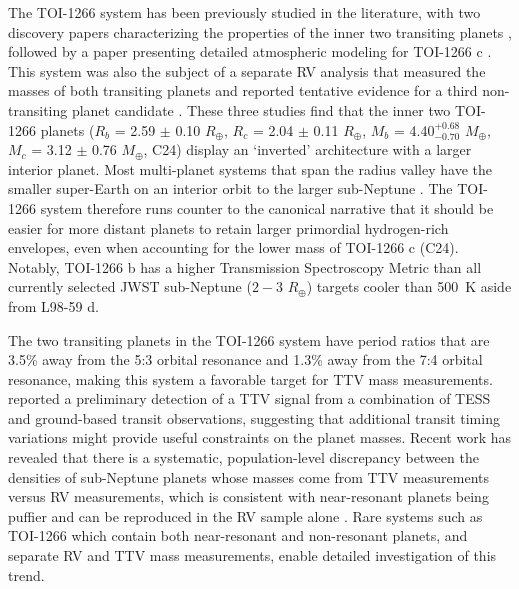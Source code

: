 \documentclass[twocolumn]{aastex631}
\begin{document}
The TOI-1266 system has been previously studied in the literature, with two discovery papers characterizing the properties of the inner two transiting planets \citep[][hereafter D20 and S20]{Demory_2020,Stefansson_2020}, followed by a paper presenting detailed atmospheric modeling for TOI-1266 c \citep{Harman_2022}. This system was also the subject of a separate RV analysis that measured the masses of both transiting planets and reported tentative evidence for a third non-transiting planet candidate \citep[][hereafter C24]{Cloutier_2024}. These three studies find that the inner two TOI-1266 planets ($R_b$ = 2.59 $\pm$ 0.10 $R_{\oplus}$, $R_c$ = 2.04 $\pm$ 0.11 $R_{\oplus}$, $M_b$ = 4.40$^{+0.68}_{-0.70}$ $M_{\oplus}$, $M_c$ = 3.12 $\pm$ 0.76 $M_{\oplus}$, C24) display an ‘inverted’ architecture with a larger interior planet. Most multi-planet systems that span the radius valley have the smaller super-Earth on an interior orbit to the larger sub-Neptune \citep[e.g.,][]{Weiss2018}. The TOI-1266 system therefore runs counter to the canonical narrative that it should be easier for more distant planets to retain larger primordial hydrogen-rich envelopes, even when accounting for the lower mass of TOI-1266 c (C24). Notably, TOI-1266 b has a higher Transmission Spectroscopy Metric \citep[TSM; this indicates the planet's relative favorability for atmospheric characterization with transmission spectroscopy, see][]{Kempton2018} than all currently selected JWST sub-Neptune ($2-3$ $R_\oplus$) targets cooler than 500~K aside from L98-59 d.

The two transiting planets in the TOI-1266 system have period ratios that are 3.5\% away from the 5:3 orbital resonance and 1.3\% away from the 7:4 orbital resonance, making this system a favorable target for TTV mass measurements. \cite{Demory_2020} reported a preliminary detection of a TTV signal from a combination of TESS and ground-based transit observations, suggesting that additional transit timing variations might provide useful constraints on the planet masses. Recent work has revealed that there is a systematic, population-level discrepancy between the densities of sub-Neptune planets whose masses come from TTV measurements versus RV measurements, which is consistent with near-resonant planets being puffier and can be reproduced in the RV sample alone \citep{Leleu2024}. Rare systems such as TOI-1266 which contain both near-resonant and non-resonant planets, and separate RV and TTV mass measurements, enable detailed investigation of this trend.
\end{document}
